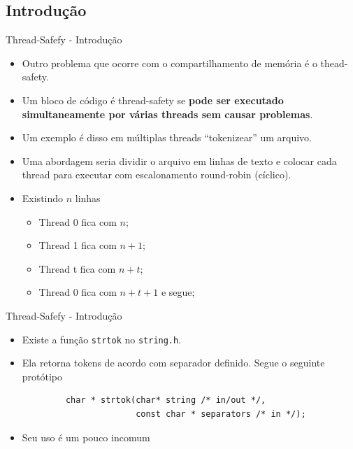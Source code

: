 	\subsection{Introdução}
	\begin{frame}[fragile]{Thread-Safefy - Introdução}
		\begin{itemize}
			\item Outro problema que ocorre com o compartilhamento de memória é o thead-safety.
			\item Um bloco de código é thread-safety se \textbf{pode ser executado simultaneamente por várias threads sem causar problemas}.
			\item Um exemplo é disso em múltiplas threads ``tokenizear'' um arquivo.
			\item Uma abordagem seria dividir o arquivo em linhas de texto e colocar cada thread para executar com escalonamento round-robin (cíclico).
			\item Existindo $n$ linhas
			\begin{itemize}
				\item Thread 0 fica com $n$;
				\item Thread 1 fica com $n+1$;
				\item Thread t fica com $n+t$;
				\item Thread 0 fica com $n+t+1$ e segue;
			\end{itemize}
		\end{itemize}
\end{frame}

	\begin{frame}[fragile]{Thread-Safefy - Introdução}
		\begin{itemize}
			\item Existe a função {\tt strtok} no {\tt string.h}.
			\item Ela retorna tokens de acordo com separador definido. Segue o seguinte protótipo
		\end{itemize}
		\begin{verbatim}
			char * strtok(char* string /* in/out */, 
						  const char * separators /* in */);
		\end{verbatim}
				\pause
		\begin{itemize}
			\item Seu uso é um pouco incomum
		\end{itemize}
\end{frame}

